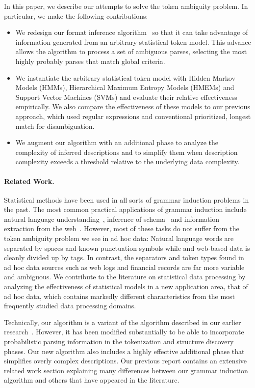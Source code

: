 In this paper, we describe our attempts to solve the token ambiguity problem.
In particular, we make the following contributions:
\begin{itemize}
\item We redesign our format inference algorithm~\cite{fisher+:dirttoshovels} 
so that it can take advantage of information 
generated from an arbitrary statistical token model.
This advance allows the algorithm to process a set of
ambiguous parses, selecting the most highly probably parses that 
match global criteria.
\item We instantiate the arbitrary statistical token model with
Hidden Markov Models (HMMs), Hierarchical Maximum Entropy Models
(HMEMs) and Support Vector Machines (SVMs) and evaluate 
their relative effectiveness empirically.  We also compare the effectiveness of
these models to our previous approach, which used regular expressions
and conventional prioritized, longest match for disambiguation.
\item We augment our algorithm with an additional phase to
analyze the complexity of inferred descriptions and to simplify
them when description complexity exceeds a threshold relative to
the underlying data complexity.
\end{itemize}

\paragraph*{Related Work.}
Statistical methods have been used in all sorts of
grammar induction problems in the 
past.
The most common practical applications of grammar induction
include natural language understanding~\cite{Chen95bayesiangrammar},
inference of \xml{} schema~\cite{bex+:dtd-inference} and 
information extraction from the
web~\cite{hong:thesis,arasu+:sigmod03long}.  However, most of these 
tasks do not suffer from the
token ambiguity problem we see in ad hoc data:  
Natural language words are separated
by spaces and known punctuation symbols while \xml{} 
and web-based data is cleanly divided up by tags.  In contrast,
the separators and token types found in ad hoc data sources such as
web logs and financial records are far more variable and 
ambiguous.  We contribute to the literature on statistical 
data processing by analyzing the effectiveness of statistical models
in a new application area, that of ad hoc data, which contains 
markedly different characteristics from the most frequently studied
data processing domains.

Technically, our algorithm is a variant of the algorithm described in
our earlier research~\cite{fisher+:dirttoshovels}.  However, it has
been modified substantially to be able to incorporate probabilistic
parsing information in the tokenization and structure discovery
phases.  Our new algorithm also includes a highly effective additional
phase that simplifies overly complex descriptions.  Our previous
report contains an extensive related work section explaining many
differences between our grammar induction algorithm and others that
have appeared in the literature.


